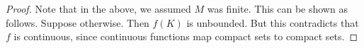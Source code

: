 \documentclass[11pt, letterpaper]{article}
\begin{document}
\begin{enumerate}
\begin{proof}
    Note that in the above, we assumed $M$ was finite. This can be shown as follows. Suppose otherwise. Then $f(K)$ is unbounded. But this contradicts that $f$ is continuous, since continuous functions map compact sets to compact sets. 
  \end{proof}




\end{enumerate}
\end{document}
